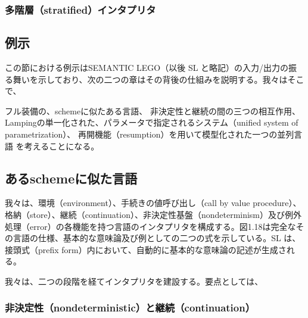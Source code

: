 \documentclass[11pt, oneside]{jsarticle}   	%
\begin{document}






\subsubsection{多階層（stratified）インタプリタ}






\subsection{例示}
この節における例示はSEMANTIC LEGO（以後 SL と略記）の入力/出力の振る舞いを示しており、次の二つの章はその背後の仕組みを説明する。我々はそこで、

フル装備の、schemeに似たある言語、
非決定性と継続の間の三つの相互作用、
Lampingの単一化された、パラメータで指定されるシステム（unified system of parametrization）、
再開機能（resumption）を用いて模型化された一つの並列言語
を考えることになる。







\subsection{あるschemeに似た言語}
我々は、環境（environment）、手続きの値呼び出し（call by value procedure）、格納（store）、継続（continuation）、非決定性基盤（nondeterminism）及び例外処理（error）の各機能を持つ言語のインタプリタを構成する。図1.18は完全なその言語の仕様、基本的な意味論及び例としての二つの式を示している。SL は、接頭式（prefix form）内において、自動的に基本的な意味論の記述が生成される。

我々は、二つの段階を経てインタプリタを建設する。要点としては、

\subsubsection{非決定性（nondeterministic）と継続（continuation）}
\end{document}
